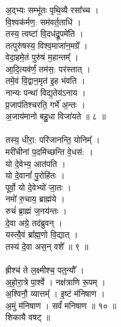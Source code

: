 \subsubsection{}
अ॒द्भ्यः सम्भू॑तः पृथि॒व्यै रसा᳚च्च ।\\
वि॒श्वक॑र्मण॒: सम॑वर्त॒ताधि॑ ।\\
तस्य॒ त्वष्टा॑ वि॒दध॑द्रू॒पमे॑ति ।\\
तत्पुरु॑षस्य॒ विश्व॒माजा॑न॒मग्रे᳚ ।\\
वेदा॒हमे॒तं पुरु॑षं म॒हान्तम्᳚ ।\\
आ॒दि॒त्यव॑र्णं॒ तम॑स॒: पर॑स्तात् ।\\
तमे॒वं वि॒द्वान॒मृत॑ इ॒ह भ॑वति ।\\
नान्यः पन्था॑ विद्य॒तेय॑ऽनाय ।\\
प्र॒जाप॑तिश्चरति॒ गर्भे॑ अ॒न्तः ।\\
अ॒जाय॑मानो बहु॒धा विजा॑यते ॥ ८ ॥\\
\\
तस्य॒ धीरा॒: परि॑जानन्ति॒ योनिम्᳚ ।\\
मरी॑चीनां प॒दमि॑च्छन्ति वे॒धस॑: ।\\
यो दे॒वेभ्य॒ आत॑पति ।\\
यो दे॒वानां᳚ पु॒रोहि॑तः ।\\
पूर्वो॒ यो दे॒वेभ्यो॑ जा॒तः ।\\
नमो॑ रु॒चाय॒ ब्राह्म॑ये ।\\
रुचं॑ ब्रा॒ह्मं ज॒नय॑न्तः ।\\
दे॒वा अग्रे॒ तद॑ब्रुवन् ।\\
यस्त्वै॒वं ब्रा᳚ह्म॒णो वि॒द्यात् ।\\
तस्य॑ दे॒वा अस॒न् वशे᳚ ॥ ९ ॥\\
\\
ह्रीश्च॑ ते ल॒क्ष्मीश्च॒ पत्॒न्यौ᳚ ।\\
अ॒हो॒रा॒त्रे पा॒र्श्वे । नक्ष॑त्राणि रू॒पम् ।\\
अ॒श्विनौ॒ व्यात्तम्᳚ । इ॒ष्टं म॑निषाण ।\\
अ॒मुं म॑निषाण । सर्वं॑ मनिषाण ॥ १० ॥\\
शिकायै वषट् ॥\\

